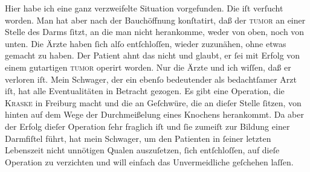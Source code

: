 \pstart
           Hier habe ich eine ganz
               verzweifelte Situation vorgefunden. Die \label{K_L03243-2v}\label{K_L03243-2} iſt verſucht worden. Man hat aber nach der Bauchöffnung konſtatirt, daß der
                  \textsc{tumor} an einer Stelle des Darms{ }ſitzt, an die man nicht
               herankomme, weder von oben, noch von unten. Die Ärzte haben{ }ſich alſo entſchloſſen,
               wieder zuzunähen, ohne etwas gemacht zu haben. Der Patient ahnt das nicht und glaubt, er{ }ſei
               mit Erfolg von einem gutartigen \textsc{tumor} operirt worden. Nur
               die Ärzte und ich wiſſen, daß er verloren iſt. {\pb}Mein
                  Schwager, der ein ebenſo
               bedeutender als bedachtſamer Arzt iſt, hat alle Eventualitäten in Betracht gezogen.
               Es gibt eine Operation, die \textsc{Kraske} in Freiburg macht und die an Geſchwüre, die
               an dieſer Stelle{ }ſitzen, von hinten auf dem Wege der Durchmeißelung eines Knochens
               herankommt. Da aber der Erfolg dieſer Operation{ }ſehr fraglich iſt und{ }ſie zumeiſt zur
               Bildung einer Darmfiſtel führt, hat mein Schwager, um den Patienten in{ }ſeiner letzten Lebenszeit nicht unnötigen Qualen
               auszuſetzen,{ }ſich entſchloſſen, auf dieſe Operation zu verzichten und will einfach
               das Unvermeidliche geſchehen laſſen.\pend
           
